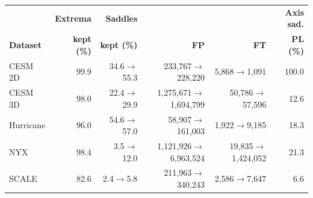 \begin{tabular}{@{}lrrrrr@{}}
\toprule
 & \textbf{Extrema} & \textbf{Saddles} & & & \textbf{Axis sad.} \\
\textbf{Dataset} & \textbf{kept (\%)} & \textbf{kept (\%)} & \textbf{FP} & \textbf{FT} & \textbf{PL (\%)} \\
\midrule
CESM 2D & 99.9 & 34.6$\to$55.3 & 233{,}767$\to$228{,}220 & 5{,}868$\to$1{,}091 & 100.0 \\
CESM 3D & 98.0 & 22.4$\to$29.9 & 1{,}275{,}671$\to$1{,}694{,}799 & 50{,}786$\to$57{,}596 & 12.6 \\
Hurricane & 96.0 & 54.6$\to$57.0 & 58{,}907$\to$161{,}003 & 1{,}922$\to$9{,}185 & 18.3 \\
NYX & 98.4 & 3.5$\to$12.0 & 1{,}121{,}926$\to$6{,}963{,}524 & 19{,}835$\to$1{,}424{,}052 & 21.3 \\
SCALE & 82.6 & 2.4$\to$5.8 & 211{,}963$\to$340{,}243 & 2{,}586$\to$7{,}647 & 6.6 \\
\bottomrule
\end{tabular}
